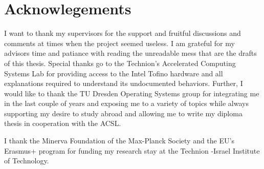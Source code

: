 \section*{Acknowlegements}
I want to thank my supervisors for the support and fruitful discussions and comments at times when the project seemed useless. I am grateful for my advisors time and patiance with reading the unreadable mess that are the drafts of this thesis. Special thanks go to the Technion's Accelerated Computing Systems Lab for providing access to the Intel Tofino hardware and all explanations required to understand its undocumented behaviors. Further, I would like to thank the TU Dresden Operating Systems group for integrating me in the last couple of years and exposing me to a variety of topics while always supporting my desire to study abroad and allowing me to write my diploma thesis in cooperation with the ACSL.\@

I thank the Minerva Foundation of the Max-Planck Society and the EU's Erasmus+ program for funding my research stay at the Technion -\@ Israel Institute of Technology.

